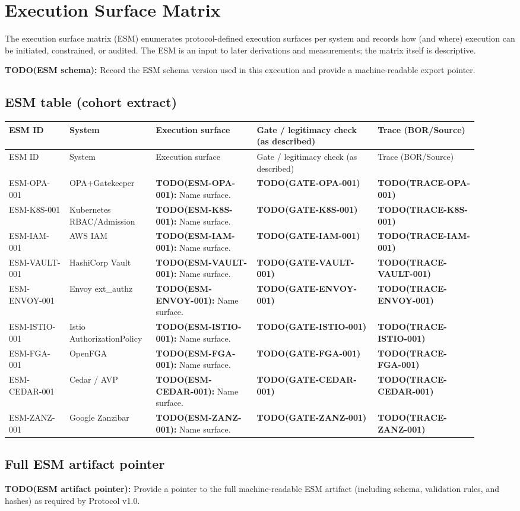\section{Execution Surface Matrix}
\label{sec:esm}
The execution surface matrix (ESM) enumerates protocol-defined execution surfaces per system and records how (and where) execution can be initiated, constrained, or audited. The ESM is an input to later derivations and measurements; the matrix itself is descriptive.

\textbf{TODO(ESM schema):} Record the ESM schema version used in this execution and provide a machine-readable export pointer.

\subsection{ESM table (cohort extract)}
\begin{center}
\begin{longtable}{@{}p{0.12\linewidth}p{0.16\linewidth}p{0.20\linewidth}p{0.24\linewidth}p{0.20\linewidth}@{}}
\toprule
ESM ID & System & Execution surface & Gate / legitimacy check (as described) & Trace (BOR/Source) \\
\midrule
\endfirsthead
\toprule
ESM ID & System & Execution surface & Gate / legitimacy check (as described) & Trace (BOR/Source) \\
\midrule
\endhead
\bottomrule
\endfoot
\bottomrule
\endlastfoot
ESM-OPA-001 & OPA+Gatekeeper & \textbf{TODO(ESM-OPA-001):} Name surface. & \textbf{TODO(GATE-OPA-001)} & \textbf{TODO(TRACE-OPA-001)} \\
ESM-K8S-001 & Kubernetes RBAC/Admission & \textbf{TODO(ESM-K8S-001):} Name surface. & \textbf{TODO(GATE-K8S-001)} & \textbf{TODO(TRACE-K8S-001)} \\
ESM-IAM-001 & AWS IAM & \textbf{TODO(ESM-IAM-001):} Name surface. & \textbf{TODO(GATE-IAM-001)} & \textbf{TODO(TRACE-IAM-001)} \\
ESM-VAULT-001 & HashiCorp Vault & \textbf{TODO(ESM-VAULT-001):} Name surface. & \textbf{TODO(GATE-VAULT-001)} & \textbf{TODO(TRACE-VAULT-001)} \\
ESM-ENVOY-001 & Envoy ext\_authz & \textbf{TODO(ESM-ENVOY-001):} Name surface. & \textbf{TODO(GATE-ENVOY-001)} & \textbf{TODO(TRACE-ENVOY-001)} \\
ESM-ISTIO-001 & Istio AuthorizationPolicy & \textbf{TODO(ESM-ISTIO-001):} Name surface. & \textbf{TODO(GATE-ISTIO-001)} & \textbf{TODO(TRACE-ISTIO-001)} \\
ESM-FGA-001 & OpenFGA & \textbf{TODO(ESM-FGA-001):} Name surface. & \textbf{TODO(GATE-FGA-001)} & \textbf{TODO(TRACE-FGA-001)} \\
ESM-CEDAR-001 & Cedar / AVP & \textbf{TODO(ESM-CEDAR-001):} Name surface. & \textbf{TODO(GATE-CEDAR-001)} & \textbf{TODO(TRACE-CEDAR-001)} \\
ESM-ZANZ-001 & Google Zanzibar & \textbf{TODO(ESM-ZANZ-001):} Name surface. & \textbf{TODO(GATE-ZANZ-001)} & \textbf{TODO(TRACE-ZANZ-001)} \\
\end{longtable}
\end{center}

\subsection{Full ESM artifact pointer}
\textbf{TODO(ESM artifact pointer):} Provide a pointer to the full machine-readable ESM artifact (including schema, validation rules, and hashes) as required by Protocol v1.0.
